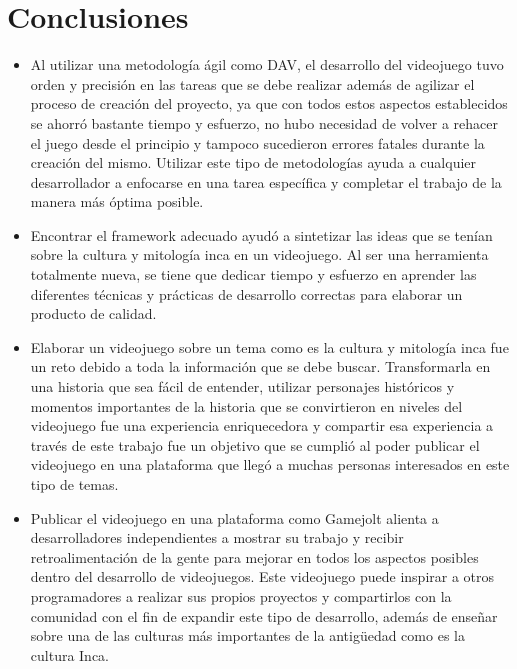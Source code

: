 \documentclass[a4paper, openright, 12pt]{report}
\begin{document}
\section{Conclusiones}
\begin{itemize}
\item Al utilizar una metodología ágil como DAV, el desarrollo del videojuego tuvo orden y precisión en las tareas que se debe realizar además de agilizar el proceso de creación del proyecto, ya que con todos estos aspectos establecidos se ahorró bastante tiempo y esfuerzo, no hubo necesidad de volver a rehacer el juego  desde el principio y tampoco sucedieron errores fatales durante la creación del mismo. Utilizar este tipo de metodologías ayuda a cualquier desarrollador a enfocarse en una tarea específica y completar el trabajo de la manera más óptima posible. 

\item Encontrar el framework adecuado ayudó a sintetizar las ideas que se tenían sobre la cultura y mitología inca en un videojuego. Al ser una herramienta totalmente nueva, se tiene que dedicar tiempo y esfuerzo en aprender las diferentes técnicas y prácticas de desarrollo correctas para elaborar un producto  de calidad.

\item Elaborar un videojuego sobre un tema como es la cultura y mitología inca fue un reto debido a toda la información que se debe buscar. Transformarla en una historia que sea fácil de entender, utilizar personajes históricos y momentos importantes de la historia que se convirtieron en niveles del videojuego fue una experiencia enriquecedora y compartir esa experiencia a través de este trabajo fue un objetivo que se cumplió al poder publicar el videojuego en una plataforma que llegó a muchas personas interesados en este tipo de temas. 

\item Publicar el videojuego en una plataforma como Gamejolt alienta a desarrolladores independientes a mostrar su trabajo y recibir retroalimentación de la gente para mejorar en todos los aspectos posibles dentro del desarrollo de videojuegos. Este videojuego puede inspirar a otros programadores a realizar sus propios proyectos y compartirlos con la comunidad con el fin de expandir este tipo de desarrollo, además de enseñar sobre una de las culturas más importantes de la antigüedad como es la cultura Inca.
\end{itemize}
\clearpage
\end{document}
